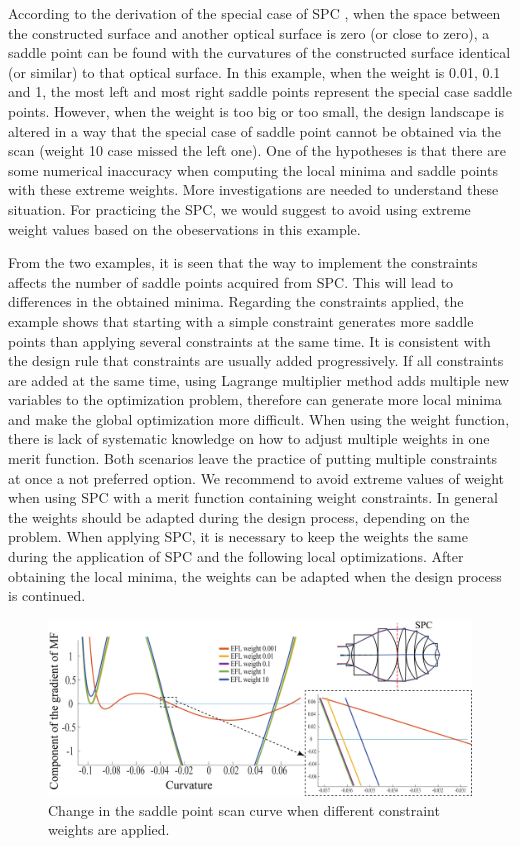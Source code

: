 According to the derivation of the special case of SPC \cite{BociortSPCSexplained}, when the space between the constructed surface and another optical surface is zero (or close to zero), a saddle point can be found with the curvatures of the constructed surface identical (or similar) to that optical surface. In this example, when the weight is 0.01, 0.1 and 1, the most left and most right saddle points represent the special case saddle points. However, when the weight is too big or too small, the design landscape is altered in a way that the special case of saddle point cannot be obtained via the scan (weight 10 case missed the left one). One of the hypotheses is that there are some numerical inaccuracy when computing the local minima and saddle points with these extreme weights. More investigations are needed to understand these situation. For practicing the SPC, we would suggest to avoid using extreme weight values based on the obeservations in this example. 

From the two examples, it is seen that the way to implement the constraints affects the number of saddle points acquired from SPC. This will lead to differences in the obtained minima. Regarding the constraints applied, the example shows that starting with a simple constraint generates more saddle points than applying several constraints at the same time. It is consistent with the design rule that constraints are usually added progressively. If all constraints are added at the same time, using Lagrange multiplier method adds multiple new variables to the optimization problem, therefore can generate more local minima and make the global optimization more difficult.  When using the weight function, there is lack of systematic knowledge on how to adjust multiple weights in one merit function. Both scenarios leave the practice of putting multiple constraints at once a not preferred option. We recommend to avoid extreme values of weight when using SPC with a merit function containing weight constraints. In general the weights should be adapted during the design process, depending on the problem. When applying SPC, it is necessary to keep the weights the same during the application of SPC and the following local optimizations. After obtaining the local minima, the weights can be adapted when the design process is continued. 

\begin{figure}[h!]
    \centering
    \includegraphics[width=\textwidth]{chapter-4/figures/Vollrath_wt_change.png}
    \caption{Change in the saddle point scan curve when different constraint weights are applied.}
    \label{fig: vollrath_wt_change}
\end{figure}

